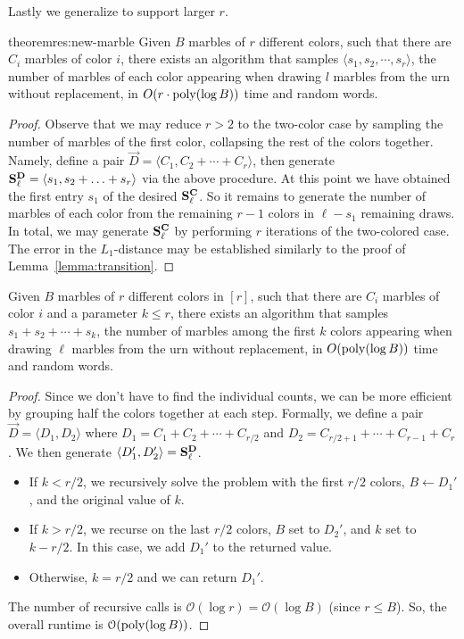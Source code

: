 Lastly we generalize to support larger $r$.
\begin{restatable}{theorem}{res:new-marble}
\label{thm:sampling_many_colors}
Given $B$ marbles of $r$ different colors, such that there are $C_i$ marbles of color $i$,
there exists an algorithm that samples $\langle s_1, s_2,\cdots, s_r \rangle$,
the number of marbles of each color appearing when drawing $l$ marbles from the urn without replacement,
in $O(r\cdot\mathrm{poly}(\log B))$ time and random words.
\end{restatable}
\begin{proof}
Observe that we may reduce $r>2$ to the two-color case by sampling the number of marbles of the first color,
collapsing the rest of the colors together.
Namely, define a pair $\vec D=\langle C_1, C_2+\cdots+C_r \rangle$,
then generate $\mathbf{S}^{\mathbf{D}}_{\ell}=\langle s_1, s_2+\ldots+s_r\rangle$ via the above procedure.
At this point we have obtained the first entry $s_1$ of the desired $\mathbf{S}^{\mathbf{C}}_{\ell}$.
So it remains to generate the number of marbles of each color from the remaining $r-1$ colors in $\ell-s_1$ remaining draws.
In total, we may generate $\mathbf{S}^{\mathbf{C}}_{\ell}$ by performing $r$ iterations of the two-colored case.
The error in the $L_1$-distance may be established similarly to the proof of Lemma~\ref{lemma:transition}.
\end{proof}
\begin{theorem}
\label{thm:sampling_many_colors_contiguous}
Given $B$ marbles of $r$ different colors in $[r]$, such that there are $C_i$ marbles of color $i$ and a parameter $k\le r$,
there exists an algorithm that samples $s_1 + s_2 +\cdots + s_k$,
the number of marbles among the first $k$ colors appearing when drawing $\ell$ marbles from the urn without replacement,
in $O(\mathrm{poly}(\log B))$ time and random words.
\end{theorem}
\begin{proof}
Since we don't have to find the individual counts, we can be more efficient by grouping half the colors together at each step.
Formally, we define a pair $\vec  D= \langle D_1,D_2 \rangle$ where $D_1=C_1 + C_2 +\cdots + C_{r/2}$ and $D_2=C_{r/2+1}+\cdots+C_{r-1}+C_r$.
We then generate $ \langle D_1', D_2'\rangle = \mathbf{S}^{\mathbf{D}}_\ell$.
\begin{itemize}
    \item If $k < r/2$, we recursively solve the problem with the first $r/2$ colors, $B\gets D_1'$, and the original value of $k$.
    \item If $k > r/2$, we recurse on the last $r/2$ colors, $B$ set to $D_2'$, and $k$ set to $k-r/2$.
    In this case, we add $D_1'$ to the returned value.
    \item Otherwise, $k=r/2$ and we can return $D_1'$.
\end{itemize}
The number of recursive calls is $\mathcal O(\log r) = \mathcal O(\log B)$ (since $r\le B$).
So, the overall runtime is $\mathcal O(\mathrm{poly}(\log B))$.
\end{proof}




